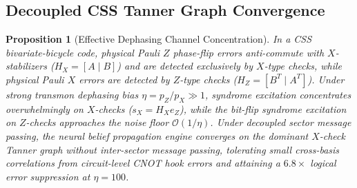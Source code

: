 \documentclass[journal]{IEEEtran}
\newtheorem{proposition}{Proposition}
\begin{document}
\subsection{Decoupled CSS Tanner Graph Convergence}
\begin{proposition}[Effective Dephasing Channel Concentration]
\label{prop:dephasing_concentration}
In a CSS bivariate-bicycle code, physical Pauli $Z$ phase-flip errors anti-commute with $X$-stabilizers ($H_X = [A \mid B]$) and are detected exclusively by $X$-type checks, while physical Pauli $X$ errors are detected by $Z$-type checks ($H_Z = [B^T \mid A^T]$). Under strong transmon dephasing bias $\eta = p_Z / p_X \gg 1$, syndrome excitation concentrates overwhelmingly on $X$-checks ($s_X = H_X e_Z$), while the bit-flip syndrome excitation on $Z$-checks approaches the noise floor $\mathcal{O}(1/\eta)$. Under decoupled sector message passing, the neural belief propagation engine converges on the dominant $X$-check Tanner graph without inter-sector message passing, tolerating small cross-basis correlations from circuit-level CNOT hook errors and attaining a $6.8\times$ logical error suppression at $\eta = 100$.
\end{proposition}
\end{document}
